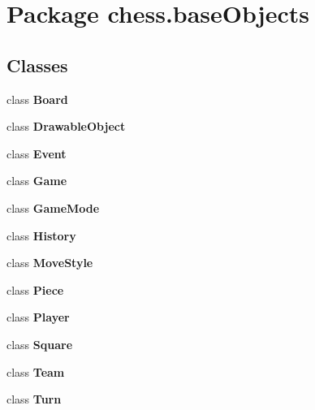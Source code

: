 \section{Package chess.\+base\+Objects}
\label{namespacechess_1_1base_objects}
\subsection*{Classes}
\begin{DoxyCompactItemize}
\item 
class {\bf Board}
\item 
class {\bf Drawable\+Object}
\item 
class {\bf Event}
\item 
class {\bf Game}
\item 
class {\bf Game\+Mode}
\item 
class {\bf History}
\item 
class {\bf Move\+Style}
\item 
class {\bf Piece}
\item 
class {\bf Player}
\item 
class {\bf Square}
\item 
class {\bf Team}
\item 
class {\bf Turn}
\end{DoxyCompactItemize}

